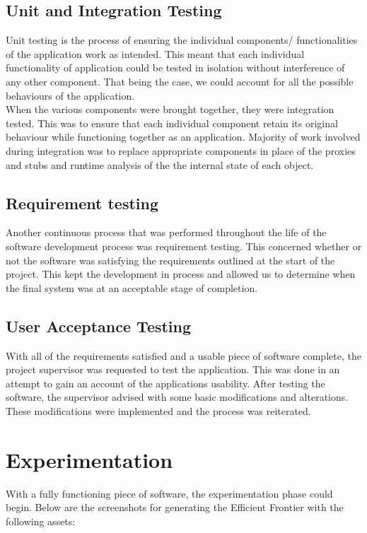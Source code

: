 \subsection{Unit and Integration Testing}
Unit testing is the process of ensuring the individual components/ functionalities of the application work as intended. This
meant that each individual functionality of application could be tested in isolation without interference of any other component. That being the case, we could account for all the possible behaviours of the application.\\
When the various components were brought together, they were integration
tested. This was to ensure that each individual component retain its original behaviour while functioning together as an application. Majority of work involved during integration was to replace appropriate components in place of the proxies and stubs and runtime analysis of the the internal state of each object.\\

\subsection{Requirement testing}
Another continuous process that was performed throughout the life of the software development process was requirement testing. This concerned whether or not the software was satisfying the requirements outlined at the start of the project. This kept the development in process and allowed us to determine when the final system was at an acceptable stage of completion.\\

\subsection{User Acceptance Testing}
With all of the requirements satisfied and a usable piece of software complete, the project supervisor was requested to test the application. This was done in an attempt to gain an account of the applications usability. After testing the software, the supervisor advised with some basic modifications and alterations. These modifications were implemented and the process was reiterated.\\

\section{Experimentation}
With a fully functioning piece of software, the experimentation phase could begin. Below are the screenshots for generating the Efficient Frontier with the following assets: 

